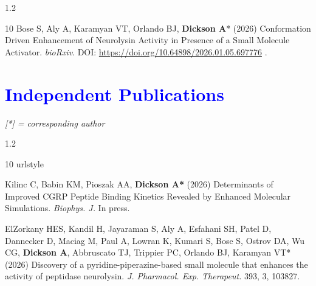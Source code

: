 \documentclass[margin,line]{res}
\begin{document}
\begin{resume}
\begin{spacing}{1.2}
\begin{thebibliography}{10}
  Bose S, Aly A, Karamyan VT, Orlando BJ, {\bf Dickson A}* (2026) Conformation Driven Enhancement of Neurolysin Activity in Presence of a Small Molecule Activator.
  \newblock \textit{bioRxiv}. DOI: \url{https://doi.org/10.64898/2026.01.05.697776} .
  
  
\end{thebibliography}
\end{spacing}
\endgroup

\section{\sc \textcolor{blue}{Independent Publications}}


\emph{[*] = corresponding author}
\vspace {0.05in}

\begingroup
\begin{spacing}{1.2}
\renewcommand{\section}[2]{}%
\begin{thebibliography}{10}
\providecommand{\url}[1]{\texttt{#1}}
\providecommand{\urlprefix}{URL }
\expandafter\ifx\csname urlstyle\endcsname\relax
  \providecommand{\doi}[1]{doi:\discretionary{}{}{}#1}\else
  \providecommand{\doi}{doi:\discretionary{}{}{}\begingroup
  \urlstyle{rm}\Url}\fi
\providecommand{\bibAnnoteFile}[1]{%
  \IfFileExists{#1}{\begin{quotation}\noindent\textsc{Key:} #1\\
  \textsc{Annotation:}\ \end{quotation}}{}}
\providecommand{\bibAnnote}[2]{%
  \begin{quotation}\noindent\textsc{Key:} #1\\
  \textsc{Annotation:}\ #2\end{quotation}}
\providecommand{\eprint}[2][]{\url{#2}}

\setlength{\itemsep}{0.15in}

  Kilinc C, Babin KM, Pioszak AA, {\bf Dickson A*} (2026) Determinants of Improved CGRP Peptide Binding Kinetics Revealed by Enhanced Molecular Simulations.
  \newblock \textit{Biophys. J.} In press.

  ElZorkany HES, Kandil H, Jayaraman S, Aly A, Esfahani SH, Patel D, Dannecker D, Maciag M, Paul A, Lowran K, Kumari S, Bose S, Ostrov DA, Wu CG, {\bf Dickson A}, Abbruscato TJ, Trippier PC, Orlando BJ, Karamyan VT* (2026) Discovery of a pyridine-piperazine-based small molecule that enhances the activity of peptidase neurolysin.
  \newblock \textit{J. Pharmacol. Exp. Therapeut.} 393, 3, 103827.


\end{thebibliography}
\end{spacing}
\end{resume}
\end{document}
